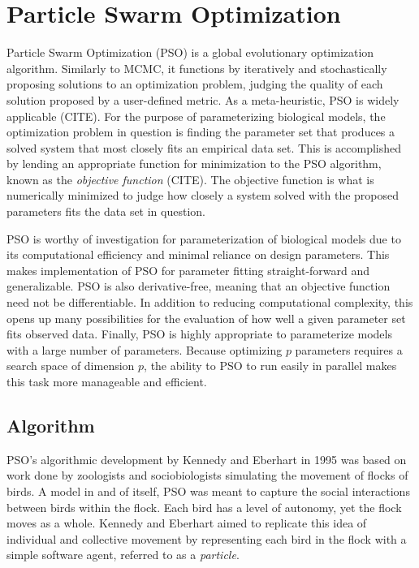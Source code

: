 \documentclass{article}
\begin{document}
\section{Particle Swarm Optimization}
Particle Swarm Optimization (PSO) is a global evolutionary optimization algorithm. Similarly to MCMC, it functions by iteratively and stochastically proposing solutions to an optimization problem, judging the quality of each solution proposed by a user-defined metric. As a meta-heuristic, PSO is widely applicable (CITE). For the purpose of parameterizing biological models, the optimization problem in question is finding the parameter set that produces a solved system that most closely fits an empirical data set. This is accomplished by lending an appropriate function for minimization to the PSO algorithm, known as the \emph{objective function} (CITE). The objective function is what is numerically minimized to judge how closely a system solved with the proposed parameters fits the data set in question.
\par PSO is worthy of investigation for parameterization of biological models due to its computational efficiency and minimal reliance on design parameters. This makes implementation of PSO for parameter fitting straight-forward and generalizable. PSO is also derivative-free, meaning that an objective function need not be differentiable. In addition to reducing computational complexity, this opens up many possibilities for the evaluation of how well a given parameter set fits observed data. Finally, PSO is highly appropriate to parameterize models with a large number of parameters. Because optimizing $p$ parameters requires a search space of dimension $p$, the ability to PSO to run easily in parallel makes this task more manageable and efficient. 

\subsection{Algorithm}
PSO's algorithmic development by Kennedy and Eberhart in 1995 was based on work done by zoologists and sociobiologists simulating the movement of flocks of birds. A model in and of itself, PSO was meant to capture the social interactions between birds within the flock. Each bird has a level of autonomy, yet the flock moves as a whole. Kennedy and Eberhart aimed to replicate this idea of individual and collective movement by representing each bird in the flock with a simple software agent, referred to as a \emph{particle}. 
\end{document}
